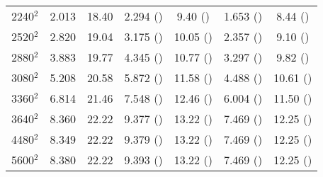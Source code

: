 \begin{table}[h]
\begin{adjustbox}{max width=\linewidth}
\begin{tabular}{ccc|cc|cc}
        2240$^2$ & 2.013 &18.40 &2.294 (\color{myred}{-12.24\%}) &9.40 (\color{mygreen1}{+95.74\%})&1.653 (\textbf{\color{mygreen1}{+17.83\%}})&8.44 (\textbf{\color{mygreen1}{+117.84\%}})\\
        2520$^2$ & 2.820 &19.04 &3.175 (\color{myred}{-11.14\%}) &10.05 (\color{mygreen1}{+89.59\%})&2.357 (\textbf{\color{mygreen1}{+19.63\%}})&9.10 (\textbf{\color{mygreen1}{+109.92\%}})\\
        2880$^2$ & 3.883 &19.77 &4.345 (\color{myred}{-10.64\%}) &10.77 (\color{mygreen1}{+83.81\%})&3.297 (\textbf{\color{mygreen1}{+17.69\%}})&9.82 (\textbf{\color{mygreen1}{+101.07\%}})\\
        3080$^2$ & 5.208 &20.58 &5.872 (\color{myred}{-11.27\%}) &11.58 (\color{mygreen1}{+77.60\%})&4.488 (\textbf{\color{mygreen1}{+16.02\%}})&10.61 (\textbf{\color{mygreen1}{+96.45\%}})\\
        3360$^2$ & 6.814 &21.46 &7.548 (\color{myred}{-9.73\%}) &12.46 (\color{mygreen1}{+70.65\%})&6.004 (\textbf{\color{mygreen1}{+13.41\%}})&11.50 (\textbf{\color{mygreen1}{+83.01\%}})\\
        3640$^2$ & 8.360 &22.22 &9.377 (\color{myred}{-10.84\%}) &13.22 (\color{mygreen1}{+57.54\%})&7.469 (\textbf{\color{mygreen1}{+11.91\%}})&12.25 (\textbf{\color{mygreen1}{+61.65\%}})\\
        4480$^2$ & 8.349 &22.22 &9.379 (\color{myred}{-10.97\%}) &13.22 (\color{mygreen1}{+57.54\%})&7.469 (\textbf{\color{mygreen1}{+11.71\%}})&12.25 (\textbf{\color{mygreen1}{+61.65\%}})\\
        5600$^2$ & 8.380 &22.22 &9.393 (\color{myred}{-10.78\%}) &13.22 (\color{mygreen1}{+57.54\%})&7.469 (\textbf{\color{mygreen1}{+12.19\%}})&12.25 (\textbf{\color{mygreen1}{+61.65\%}})\\
            \hline
            \end{tabular}  
    \end{adjustbox}
\label{tab:speedup_append}
\vspace{-2mm}
\end{table}

